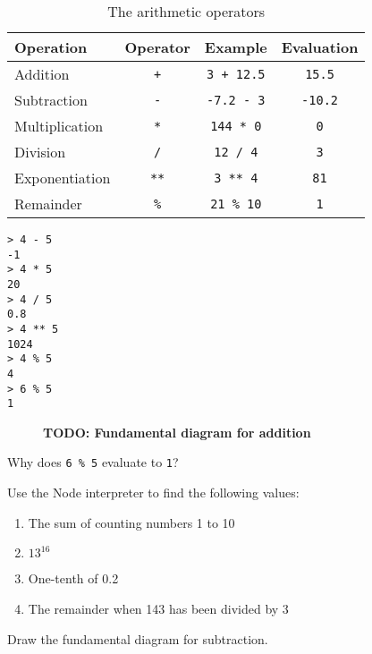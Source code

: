 \begin{table}
  \begin{tabular}{lccc}
    Operation & Operator & Example & Evaluation\\
    \hline
    Addition & \texttt{+} & \texttt{3 + 12.5} & \texttt{15.5}\\
    Subtraction & \texttt{-} & \texttt{-7.2 - 3} & \texttt{-10.2}\\
    Multiplication & \texttt{*} & \texttt{144 * 0} & \texttt{0}\\
    Division & \texttt{/} & \texttt{12 / 4} & \texttt{3}\\
    Exponentiation & \texttt{**} & \texttt{3 ** 4} & \texttt{81}\\
    Remainder & \texttt{\%} & \texttt{21 \% 10} & \texttt{1}\\
  \end{tabular}
  \caption{The arithmetic operators}
\end{table}

\begin{lstlisting}
> 4 - 5
-1
> 4 * 5
20
> 4 / 5
0.8
> 4 ** 5
1024
> 4 % 5
4
> 6 % 5
1
\end{lstlisting}

\begin{figure}
  \textbf{TODO: Fundamental diagram for addition}
\end{figure}
\begin{question}
  Why does \texttt{6 \% 5} evaluate to \texttt{1}?
\end{question}

\begin{question}
  Use the Node interpreter to find the following values:
  \begin{enumerate}
    \item The sum of counting numbers 1 to 10
    \item $13^{16}$
    \item One-tenth of 0.2
    \item The remainder when 143 has been divided by 3
  \end{enumerate}
\end{question}

\begin{question}
  Draw the fundamental diagram for subtraction.
\end{question}
